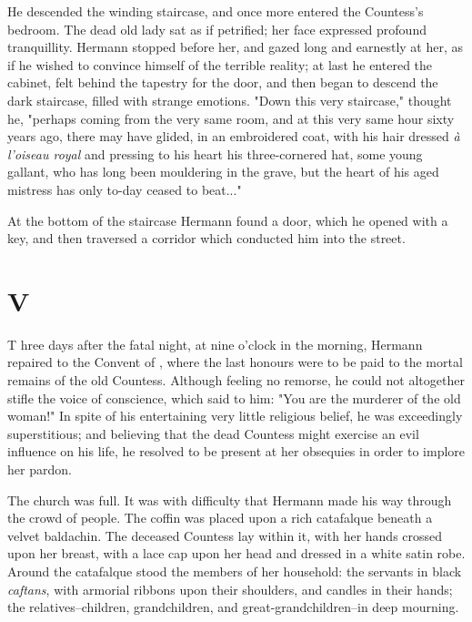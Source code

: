 He descended the winding staircase, and once more entered the
Countess's bedroom. The dead old lady sat as if petrified; her face
expressed profound tranquillity. Hermann stopped before her, and gazed
long and earnestly at her, as if he wished to convince himself of the
terrible reality; at last he entered the cabinet, felt behind the
tapestry for the door, and then began to descend the dark staircase,
filled with strange emotions. "Down this very staircase," thought he,
"perhaps coming from the very same room, and at this very same hour
sixty years ago, there may have glided, in an embroidered coat, with
his hair dressed \emph{à l'oiseau royal} and pressing to his heart his
three-cornered hat, some young gallant, who has long been mouldering
in the grave, but the heart of his aged mistress has only to-day
ceased to beat..."

At the bottom of the staircase Hermann found a door, which he opened
with a key, and then traversed a corridor which conducted him into the
street.



\section{V}


\lettrine[lines=3,lhang=0.11,lraise=0,loversize=0.05]{T}{}%
hree days after the fatal night, at nine o'clock in the morning,
Hermann repaired to the Convent of , where the last honours were
to be paid to the mortal remains of the old Countess. Although feeling
no remorse, he could not altogether stifle the voice of conscience,
which said to him: "You are the murderer of the old woman!" In spite
of his entertaining very little religious belief, he was exceedingly
superstitious; and believing that the dead Countess might exercise an
evil influence on his life, he resolved to be present at her obsequies
in order to implore her pardon.

The church was full. It was with difficulty that Hermann made his way
through the crowd of people. The coffin was placed upon a rich
catafalque beneath a velvet baldachin. The deceased Countess lay
within it, with her hands crossed upon her breast, with a lace cap
upon her head and dressed in a white satin robe. Around the catafalque
stood the members of her household: the servants in black \emph{caftans},
with armorial ribbons upon their shoulders, and candles in their
hands; the relatives--children, grandchildren, and
great-grandchildren--in deep mourning.

